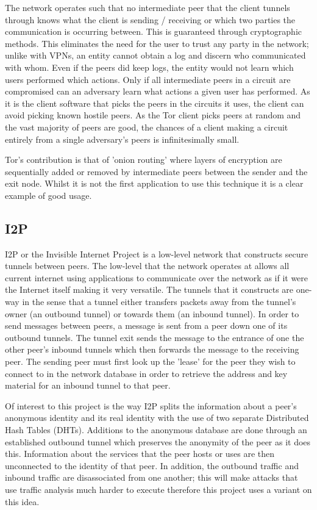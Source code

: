 \documentclass[ %
                    author={Luke Murray},
                supervisor={Dr. Simon Hollis},
                     title={Shadow Peer-to-Peer Networks},
                  subtitle={},
                    degree={MEng},
                      year={2013} ]{thesis}
\begin{document}
The network operates such that no intermediate peer that the client tunnels through knows what the client is sending / receiving or which two parties the communication is occurring between. This is guaranteed through cryptographic methods. This eliminates the need for the user to trust any party in the network; unlike with VPNs, an entity cannot obtain a log and discern who communicated with whom. Even if the peers did keep logs, the entity would not learn which users performed which actions. Only if all intermediate peers in a circuit are compromised can an adversary learn what actions a given user has performed. As it is the client software that picks the peers in the circuits it uses, the client can avoid picking known hostile peers. As the Tor client picks peers at random and the vast majority of peers are good, the chances of a client making a circuit entirely from a single adversary's peers is infinitesimally small.

Tor's contribution is that of 'onion routing' where layers of encryption are sequentially added or removed by intermediate peers between the sender and the exit node. Whilst it is not the first application to use this technique it is a clear example of good usage.

\subsection{I2P}

I2P\cite{I2P} or the Invisible Internet Project is a low-level network that constructs secure tunnels between peers. The low-level that the network operates at allows all current internet using applications to communicate over the network as if it were the Internet itself making it very versatile. The tunnels that it constructs are one-way in the sense that a tunnel either transfers packets away from the tunnel's owner (an outbound tunnel) or towards them (an inbound tunnel). In order to send messages between peers, a message is sent from a peer down one of its outbound tunnels. The tunnel exit sends the message to the entrance of one the other peer's inbound tunnels which then forwards the message to the receiving peer. The sending peer must first look up the 'lease' for the peer they wish to connect to in the network database in order to retrieve the address and key material for an inbound tunnel to that peer.

Of interest to this project is the way I2P splits the information about a peer's anonymous identity and its real identity with the use of two separate Distributed Hash Tables (DHTs). Additions to the anonymous database are done through an established outbound tunnel which preserves the anonymity of the peer as it does this. Information about the services that the peer hosts or uses are then unconnected to the identity of that peer. In addition, the outbound traffic and inbound traffic are disassociated from one another; this will make attacks that use traffic analysis much harder to execute therefore this project uses a variant on this idea.
\end{document}

